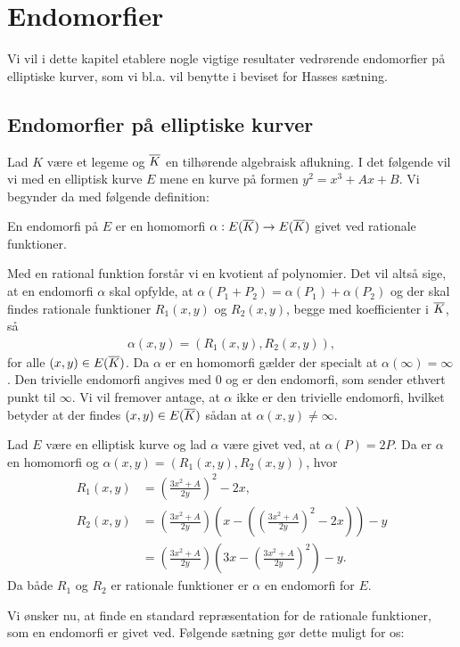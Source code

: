 \chapter{Endomorfier}
Vi vil i dette kapitel etablere nogle vigtige resultater vedrørende endomorfier på elliptiske kurver, som vi bl.a. vil benytte i beviset for Hasses sætning.

\section{Endomorfier på elliptiske kurver}
Lad $K$ være et legeme og $\overline{K}$ en tilhørende algebraisk aflukning. I det følgende vil vi med en elliptisk kurve $E$ mene en kurve på formen $y^2 = x^3 + Ax + B$. 
Vi begynder da med følgende definition:

\begin{definition}
En endomorfi på $E$ er en homomorfi $\alpha : E(\overline{K}) \to E(\overline{K})$ givet
ved rationale funktioner.
\end{definition}
Med en rational funktion forstår vi en kvotient af polynomier. Det vil altså sige, at 
en endomorfi $\alpha$ skal opfylde, at $\alpha(P_1 + P_2) = \alpha(P_1) + \alpha(P_2)$ 
og der skal findes rationale 
funktioner $R_1(x, y)$ og $R_2(x, y)$, begge med koefficienter i $\overline{K}$, så
\begin{align*}
	\alpha(x, y) = (R_1(x, y), R_2(x, y)),
\end{align*}
for alle $(x, y) \in E(\overline{K})$. Da $\alpha$ er en homomorfi gælder der specialt at $\alpha(\infty)=\infty$. Den trivielle endomorfi angives med $0$ og er den endomorfi, som sender ethvert punkt til $\infty$. Vi vil fremover antage, at $\alpha$ ikke er den trivielle endomorfi, hvilket betyder at der findes 
$(x, y) \in E(\overline{K})$ sådan at $\alpha(x, y) \neq \infty$.

\begin{example}
Lad $E$ være en elliptisk kurve og lad $\alpha$ være givet ved, at $\alpha(P)=2P$. Da er $\alpha$ en homomorfi og
$\alpha(x, y) = (R_1(x, y), R_2(x, y))$, hvor
\begin{align*}
	R_1(x, y) &= \left( \frac{3x^2 + A}{2y} \right)^2 - 2x, \\
	R_2(x, y) &= \left( \frac{3x^2 + A}{2y} \right) \left(x - \left( \left( \frac{3x^2 + A}{2y} \right)^2 - 
	2x \right) \right) - y \\
	&= \left( \frac{3x^2 + A}{2y} \right) \left(3x - \left( \frac{3x^2 + A}{2y} \right)^2 \right) - y.
\end{align*}
Da både $R_1$ og $R_2$ er rationale funktioner er $\alpha$ en endomorfi for $E$.
\end{example}
Vi ønsker nu, at finde en standard repræsentation for de rationale funktioner, som en endomorfi er givet ved. Følgende sætning gør dette muligt for os:

